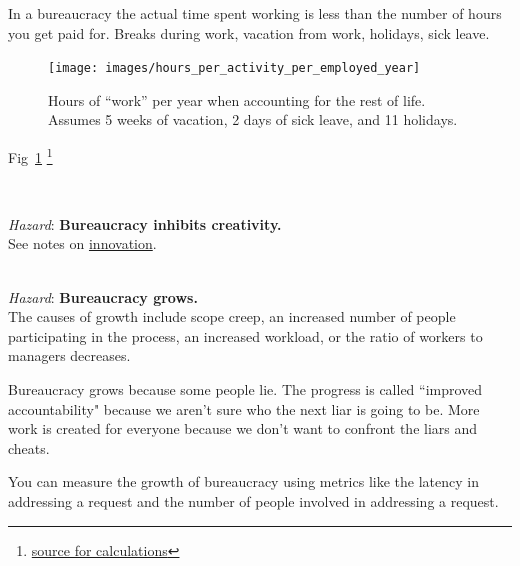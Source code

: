 
In a bureaucracy the actual time spent working is less than the number of hours you get paid for. Breaks during work, vacation from work, holidays, sick leave. 


\begin{figure}[H]
    \centering
    \texttt{[image: images/hours\_per\_activity\_per\_employed\_year]}
    \caption{Hours of ``work'' per year when accounting for the rest of life. Assumes 5 weeks of vacation, 2 days of sick leave, and 11 holidays.}
    \label{fig:hours_per_year}
\end{figure}

Fig~\ref{fig:hours_per_year}
\footnote{\href{https://docs.google.com/spreadsheets/d/1ZaOZZXWkEzX4fFltUdlR4A6ENrAXnkzTW4YrjA4tDO8/edit?usp=sharing}{source for calculations}}

\ \\

\begin{samepage}
\textit{Hazard}: \textbf{Bureaucracy inhibits creativity.}\\
See 
notes on \hyperref[sec:innovation]{innovation}.
\end{samepage}

\ \\

\textit{Hazard}: \textbf{Bureaucracy grows.}\\
The causes of growth include
scope creep, an increased number of people participating in the process, an increased workload, or the ratio of workers to managers decreases. 

Bureaucracy grows because some people lie. 
The progress is called ``improved accountability" because we aren't sure who the next liar is going to be.
More work is created for everyone because we don't want to confront the liars and cheats. 


You can measure the growth of bureaucracy using metrics like the latency in addressing a request and the number of people involved in addressing a request.  

